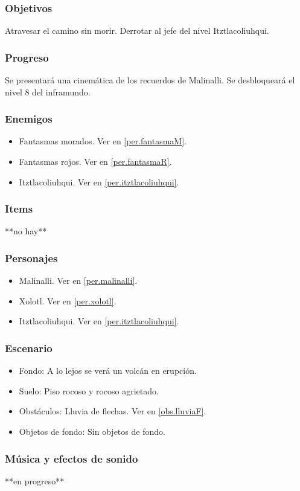 \documentclass[11pt,letterpaper]{article}
\begin{document}
	\subsubsection{Objetivos}
	Atravesar el camino sin morir. Derrotar al jefe del nivel Itztlacoliuhqui.
	\subsubsection{Progreso}
	Se presentará una cinemática de los recuerdos de Malinalli. Se desbloqueará el nivel 8 del inframundo. 
	\subsubsection{Enemigos}
	\begin{itemize}
		\item Fantasmas morados. Ver en \ref{per.fantasmaM}.
		\item Fantasmas rojos. Ver en \ref{per.fantasmaR}.
		\item Itztlacoliuhqui. Ver en \ref{per.itztlacoliuhqui}.
	\end{itemize}
	\subsubsection{Items}
	**no hay**
	\subsubsection{Personajes}
	\begin{itemize}
		\item Malinalli. Ver en \ref{per.malinalli}.
		\item Xolotl. Ver en \ref{per.xolotl}.
		\item Itztlacoliuhqui. Ver en \ref{per.itztlacoliuhqui}.
	\end{itemize}
	\subsubsection{Escenario}
\begin{itemize} 
	\item Fondo: A lo lejos se verá un volcán en erupción.
	\item Suelo: Piso rocoso y rocoso agrietado.
	\item Obstáculos: Lluvia de flechas. Ver en \ref{obs.lluviaF}.
	\item Objetos de fondo: Sin objetos de fondo.
\end{itemize}	
	\subsubsection{Música y efectos de sonido}
	**en progreso**
\end{document}
